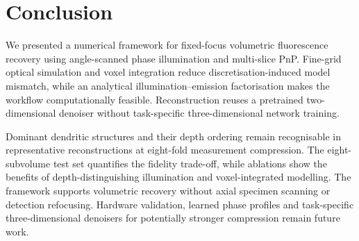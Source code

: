 \section{Conclusion}

We presented a numerical framework for fixed-focus volumetric fluorescence recovery using angle-scanned phase illumination and multi-slice PnP. Fine-grid optical simulation and voxel integration reduce discretisation-induced model mismatch, while an analytical illumination--emission factorisation makes the workflow computationally feasible. Reconstruction reuses a pretrained two-dimensional denoiser without task-specific three-dimensional network training.

Dominant dendritic structures and their depth ordering remain recognisable in representative reconstructions at eight-fold measurement compression. The eight-subvolume test set quantifies the fidelity trade-off, while ablations show the benefits of depth-distinguishing illumination and voxel-integrated modelling. The framework supports volumetric recovery without axial specimen scanning or detection refocusing. Hardware validation, learned phase profiles and task-specific three-dimensional denoisers for potentially stronger compression remain future work.
